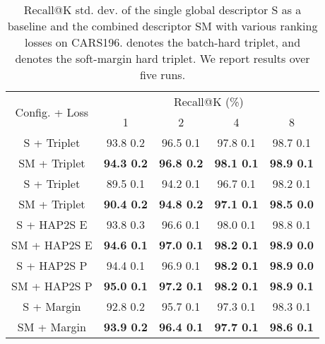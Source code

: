 \documentclass[10pt,twocolumn,letterpaper]{article}
\begin{document}
\begin{CJK}{UTF8}{mj}
\begin{table}[t!]
\begin{center}

\begin{adjustbox}{width=.5\textwidth,center}
\begin{tabular}{c|cccc}
\hline
\multirow{2}{*}{Config. + Loss}                             & \multicolumn{4}{c}{Recall@K (\%)}                 \\ \cline{2-5}
                                                           & 1          & 2          & 4          & 8          \\ \hline\hline
S + Triplet          & 93.8  0.2 & 96.5  0.1 & 97.8  0.1 & 98.7  0.1 \\
SM + Triplet         & \textbf{94.3  0.2} & \textbf{96.8  0.2} & \textbf{98.1  0.1} & \textbf{98.9  0.1} \\ \hline
S + Triplet         & 89.5  0.1 & 94.2  0.1 & 96.7  0.1 & 98.2  0.1 \\
SM + Triplet        & \textbf{90.4  0.2} & \textbf{94.8  0.2} & \textbf{97.1  0.1} & \textbf{98.5  0.0} \\ \hline
S + HAP2S E                              & 93.8  0.3 & 96.6  0.1 & 98.0  0.1 & 98.8  0.1 \\
SM + HAP2S E                             & \textbf{94.6  0.1} & \textbf{97.0  0.1} & \textbf{98.2  0.1} & \textbf{98.9  0.0} \\ \hline
S + HAP2S P                              & 94.4  0.1 & 96.9  0.1 & \textbf{98.2  0.1} & \textbf{98.9  0.0} \\
SM + HAP2S P                             & \textbf{95.0  0.1} & \textbf{97.2  0.1} & \textbf{98.2  0.1} & \textbf{98.9  0.1} \\ \hline
S + Margin                           & 92.8  0.2 & 95.7  0.1 & 97.3  0.1 & 98.3  0.1 \\
SM + Margin                          & \textbf{93.9  0.2} & \textbf{96.4  0.1} & \textbf{97.7  0.1} & \textbf{98.6  0.1} \\ \hline
\end{tabular}
\end{adjustbox}


\end{center}

\caption{Recall@K  std. dev. of the single global descriptor S as a baseline and the combined descriptor SM with various ranking losses on CARS196.  denotes the batch-hard triplet, and  denotes the soft-margin hard triplet.
We report results over five runs.}
\label{table:losses}
\vspace{-0.3em}
\end{table}


\end{CJK}
\end{document}
